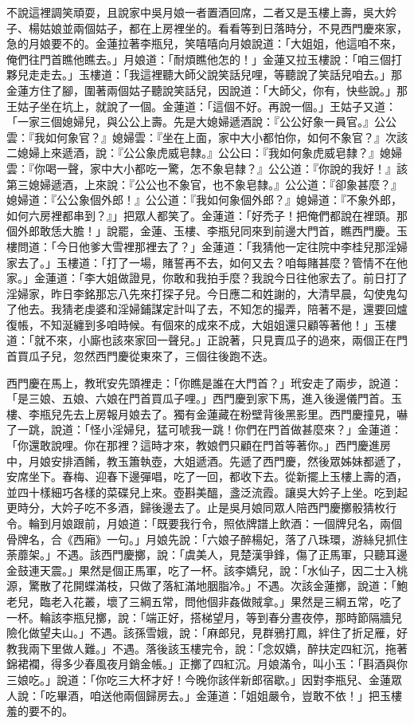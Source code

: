 不說這裡調笑頑耍，且說家中吳月娘一者置酒回席，二者又是玉樓上壽，吳大妗子、楊姑娘並兩個姑子，都在上房裡坐的。看看等到日落時分，不見西門慶來家，急的月娘要不的。金蓮拉著李瓶兒，笑嘻嘻向月娘說道：「大姐姐，他這咱不來，俺們往門首瞧他瞧去。」月娘道：「耐煩瞧他怎的！」金蓮又拉玉樓說：「咱三個打夥兒走走去。」玉樓道：「我這裡聽大師父說笑話兒哩，等聽說了笑話兒咱去。」那金蓮方住了腳，圍著兩個姑子聽說笑話兒，因說道：「大師父，你有，快些說。」那王姑子坐在坑上，就說了一個。金蓮道：「這個不好。再說一個。」王姑子又道：「一家三個媳婦兒，與公公上壽。先是大媳婦遞酒說：『公公好象一員官。』公公雲：『我如何象官？』媳婦雲：『坐在上面，家中大小都怕你，如何不象官？』次該二媳婦上來遞酒，說：『公公象虎威皂隸。』公公曰：『我如何象虎威皂隸？』媳婦雲：『你喝一聲，家中大小都吃一驚，怎不象皂隸？』公公道：『你說的我好！』該第三媳婦遞酒，上來說：『公公也不象官，也不象皂隸。』公公道：『卻象甚麼？』媳婦道：『公公象個外郎！』公公道：『我如何象個外郎？』媳婦道：『不象外郎，如何六房裡都串到？』」把眾人都笑了。金蓮道：「好禿子！把俺們都說在裡頭。那個外郎敢恁大膽！」說罷，金蓮、玉樓、李瓶兒同來到前邊大門首，瞧西門慶。玉樓問道：「今日他爹大雪裡那裡去了？」金蓮道：「我猜他一定往院中李桂兒那淫婦家去了。」玉樓道：「打了一場，賭誓再不去，如何又去？咱每賭甚麼？管情不在他家。」金蓮道：「李大姐做證見，你敢和我拍手麼？我說今日往他家去了。前日打了淫婦家，昨日李銘那忘八先來打探子兒。今日應二和姓謝的，大清早晨，勾使鬼勾了他去。我猜老虔婆和淫婦鋪謀定計叫了去，不知怎的撮弄，陪著不是，還要回爐復帳，不知涎纏到多咱時候。有個來的成來不成，大姐姐還只顧等著他！」玉樓道：「就不來，小廝也該來家回一聲兒。」正說著，只見賣瓜子的過來，兩個正在門首買瓜子兒，忽然西門慶從東來了，三個往後跑不迭。

西門慶在馬上，教玳安先頭裡走：「你瞧是誰在大門首？」玳安走了兩步，說道：「是三娘、五娘、六娘在門首買瓜子哩。」西門慶到家下馬，進入後邊儀門首。玉樓、李瓶兒先去上房報月娘去了。獨有金蓮藏在粉壁背後黑影里。西門慶撞見，嚇了一跳，說道：「怪小淫婦兒，猛可唬我一跳！你們在門首做甚麼來？」金蓮道：「你還敢說哩。你在那裡？這時才來，教娘們只顧在門首等著你。」西門慶進房中，月娘安排酒餚，教玉簫執壺，大姐遞酒。先遞了西門慶，然後眾姊妹都遞了，安席坐下。春梅、迎春下邊彈唱，吃了一回，都收下去。從新擺上玉樓上壽的酒，並四十樣細巧各樣的菜碟兒上來。壺斟美醞，盞泛流霞。讓吳大妗子上坐。吃到起更時分，大妗子吃不多酒，歸後邊去了。止是吳月娘同眾人陪西門慶擲骰猜枚行令。輪到月娘跟前，月娘道：「既要我行令，照依牌譜上飲酒：一個牌兒名，兩個骨牌名，合《西廂》一句。」月娘先說：「六娘子醉楊妃，落了八珠環，游絲兒抓住荼蘼架。」不遇。該西門慶擲，說：「虞美人，見楚漢爭鋒，傷了正馬軍，只聽耳邊金鼓連天震。」果然是個正馬軍，吃了一杯。該李嬌兒，說：「水仙子，因二士入桃源，驚散了花開蝶滿枝，只做了落紅滿地胭脂冷。」不遇。次該金蓮擲，說道：「鮑老兒，臨老入花叢，壞了三綱五常，問他個非姦做賊拿。」果然是三綱五常，吃了一杯。輪該李瓶兒擲，說：「端正好，搭梯望月，等到春分晝夜停，那時節隔牆兒險化做望夫山。」不遇。該孫雪娥，說：「麻郎兒，見群鴉打鳳，絆住了折足雁，好教我兩下里做人難。」不遇。落後該玉樓完令，說：「念奴嬌，醉扶定四紅沉，拖著錦裙襴，得多少春風夜月銷金帳。」正擲了四紅沉。月娘滿令，叫小玉：「斟酒與你三娘吃。」說道：「你吃三大杯才好！今晚你該伴新郎宿歇。」因對李瓶兒、金蓮眾人說：「吃畢酒，咱送他兩個歸房去。」金蓮道：「姐姐嚴令，豈敢不依！」把玉樓羞的要不的。

